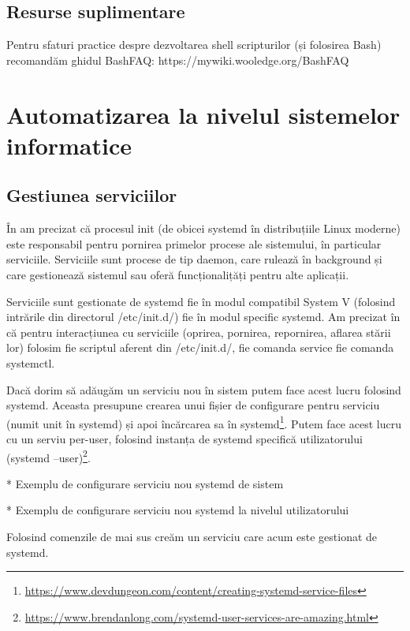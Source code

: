 \subsection{Resurse suplimentare}
\label{sec:auto-advancedfunc-supl}

Pentru sfaturi practice despre dezvoltarea shell scripturilor (și folosirea
Bash) recomandăm ghidul BashFAQ: https://mywiki.wooledge.org/BashFAQ

\section{Automatizarea la nivelul sistemelor informatice}
\label{sec:auto-infosys}

\subsection{Gestiunea serviciilor}
\label{sec:auto-infosys-services}

În  am precizat că procesul init (de obicei
systemd în distribuțiile Linux moderne) este responsabil pentru pornirea
primelor procese ale sistemului, în particular serviciile. Serviciile sunt
procese de tip daemon, care rulează în background și care gestionează sistemul
sau oferă funcționalițăți pentru alte aplicații.

Serviciile sunt gestionate de systemd fie în modul compatibil System V (folosind
intrările din directorul /etc/init.d/) fie în modul specific systemd. Am
precizat în  că pentru interacțiunea cu
serviciile (oprirea, pornirea, repornirea, aflarea stării lor) folosim fie
scriptul aferent din /etc/init.d/, fie comanda service fie comanda systemctl.

Dacă dorim să adăugăm un serviciu nou în sistem putem face acest lucru folosind
systemd. Aceasta presupune crearea unui fișier de configurare pentru serviciu
(numit unit în systemd) și apoi încărcarea sa în
systemd\footnote{\url{https://www.devdungeon.com/content/creating-systemd-service-files}}.
Putem face acest lucru cu un serviu per-user, folosind instanța de systemd
specifică utilizatorului (systemd
--user)\footnote{\url{https://www.brendanlong.com/systemd-user-services-are-amazing.html}}.

* Exemplu de configurare serviciu nou systemd de sistem

* Exemplu de configurare serviciu nou systemd la nivelul utilizatorului

Folosind comenzile de mai sus creăm un serviciu care acum este gestionat de
systemd.

